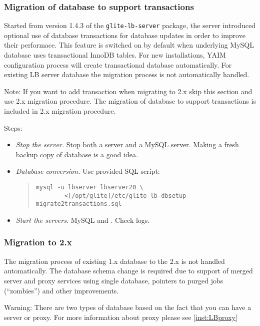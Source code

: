 \subsubsection{Migration of database to support transactions}
Started from version 1.4.3 of the \texttt{glite-lb-server}
package, the \LB server introduced optional use of database
transactions for \LB database updates in order to improve their
performace. This feature is switched on by default when underlying
MySQL database uses transactional InnoDB tables. For new
installations, YAIM configuration process will create transactional
database automatically. For existing LB server database the migration 
process is not automatically handled.

Note: If you want to add transaction when migrating to \LB 2.x skip
this section and use \LB 2.x migration procedure. The migration of
database to support transactions is included in \LB 2.x migration procedure.

Steps:
\begin{itemize}
 \item \emph{Stop the server.} Stop both a \LB server and a MySQL
 server. Making a fresh backup copy of database is a good idea.
 \item \emph{Database conversion.} Use provided SQL script:
  \begin{quote}
   \begin{verbatim}
mysql -u lbserver lbserver20 \
        <[/opt/glite]/etc/glite-lb-dbsetup-migrate2transactions.sql
   \end{verbatim}
  \end{quote}
 \item \emph{Start the servers.} MySQL and \LB. Check logs.
\end{itemize}


\subsubsection{Migration to \LB 2.x}
\label{inst:migrate20}
The migration process of existing \LB 1.x database to the \LB 2.x is
not handled automatically. The database schema change is required due
to support of merged \LB server and proxy services using single
database, pointers to purged jobs (``zombies'') and other
improvements.

Warning: There are two types of \LB database based on the fact that
you can have a \LB server or \LB proxy. For more information about \LB
proxy please see \ref{inst:LBproxy}

